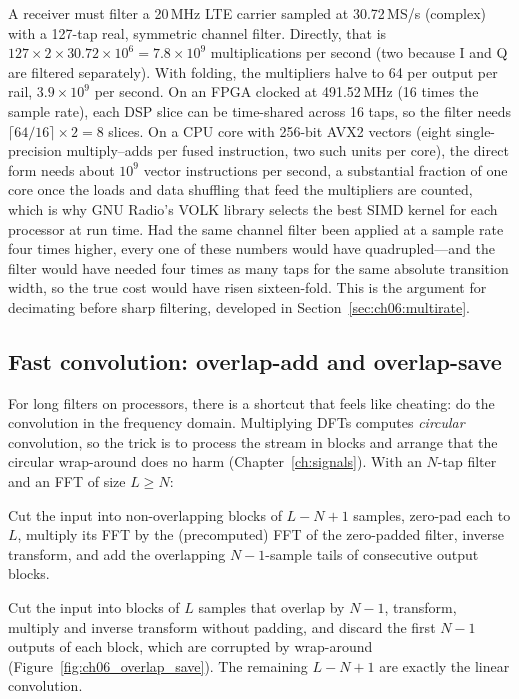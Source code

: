 \begin{worked}
A receiver must filter a 20\,MHz LTE carrier sampled at 30.72\,MS/s (complex) with a 127-tap real,
symmetric channel filter. Directly, that is $127\times2\times30.72\times10^6=7.8\times10^9$
multiplications per second (two because I and Q are filtered separately). With folding, the
multipliers halve to 64 per output per rail, $3.9\times10^9$ per second. On an FPGA clocked at
491.52\,MHz (16 times the sample rate), each DSP slice can be time-shared across 16 taps, so the
filter needs $\lceil64/16\rceil\times2=8$ slices. On a CPU core with 256-bit AVX2 vectors (eight
single-precision multiply--adds per fused instruction, two such units per core), the direct form
needs about $10^9$ vector instructions per second, a substantial fraction of one core once the loads
and data shuffling that feed the multipliers are counted, which is why GNU Radio's VOLK library
selects the best SIMD kernel for each processor at run time. Had the same channel filter been
applied at a sample rate four times higher, every one of these numbers would have quadrupled---and
the filter would have needed four times as many taps for the same absolute transition width, so the
true cost would have risen sixteen-fold. This is the argument for decimating before sharp filtering,
developed in Section~\ref{sec:ch06:multirate}.
\end{worked}

\subsection{Fast convolution: overlap-add and overlap-save}

For long filters on processors, there is a shortcut that feels like cheating: do the convolution
in the frequency domain. Multiplying DFTs computes \emph{circular} convolution, so the trick is to
process the stream in blocks and arrange that the circular wrap-around does no harm
(Chapter~\ref{ch:signals}). With an $N$-tap filter and an FFT of size $L\ge N$:
\begin{description}[style=nextline,leftmargin=1.2em,font=\sffamily\bfseries\small\color{navy}]
\item[Overlap-add.] Cut the input into non-overlapping blocks of $L-N+1$ samples, zero-pad each to
$L$, multiply its FFT by the (precomputed) FFT of the zero-padded filter, inverse transform, and
add the overlapping $N-1$-sample tails of consecutive output blocks.
\item[Overlap-save.] Cut the input into blocks of $L$ samples that overlap by $N-1$, transform,
multiply and inverse transform without padding, and discard the first $N-1$ outputs of each block,
which are corrupted by wrap-around (Figure~\ref{fig:ch06_overlap_save}). The remaining $L-N+1$ are
exactly the linear convolution.
\end{description}

